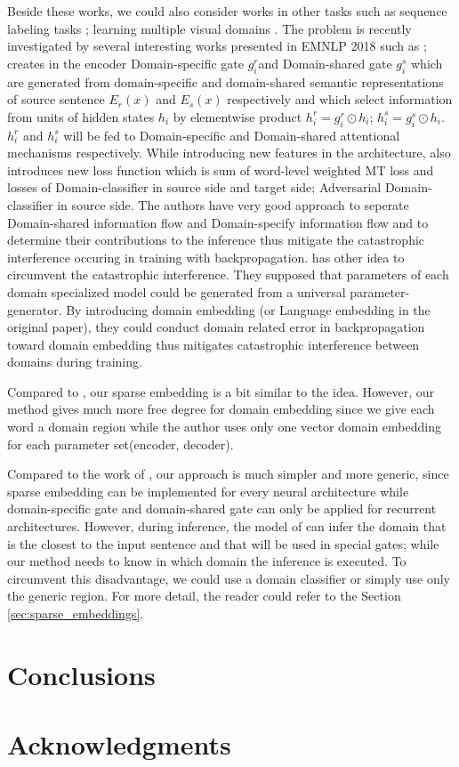 \documentclass[11pt,a4paper]{article}
\newcommand{\fyTodo}[1]{\Todo[FY:]{\textcolor{orange}{#1}}}
\begin{document}
Beside these works, we could also consider works in other tasks such as sequence labeling tasks \cite{Daume07frustratingly}; learning multiple visual domains \cite{Rebuffi2017Visual}. The problem is recently investigated by several interesting works presented in EMNLP 2018 such as \cite{Platanios18contextual}; \cite{Zeng18multidomain} creates in the encoder Domain-specific gate $g^r_i$and Domain-shared gate $g^s_i$ which are generated from domain-specific and domain-shared semantic representations of source sentence $E_r(x)$ and $E_s(x)$ respectively and which select information from units of hidden states $h_i$ by elementwise product $h^r_i = g^r_i \odot h_i$; $h^s_i = g^s_i \odot h_i$. $h^r_i$ and $h^s_i$ will be fed to Domain-specific and Domain-shared attentional mechanisms respectively. While introducing new features in the architecture, \cite{Zeng18multidomain} also introduces new loss function which is sum of word-level weighted MT loss and losses of Domain-classifier in source side and target side; Adversarial Domain-classifier in source side. The authors have very good approach to seperate Domain-shared information flow and Domain-specify information flow and to determine their contributions to the inference thus mitigate the catastrophic interference occuring in training with backpropagation. \cite{Platanios18contextual} has other idea to circumvent the catastrophic interference. They supposed that parameters of each domain specialized model could be generated from a universal parameter-generator. By introducing domain embedding (or Language embedding in the original paper), they could conduct domain related error in backpropagation toward domain embedding thus mitigates catastrophic interference between domains during training.

Compared to \cite{Platanios18contextual}, our sparse embedding is a bit similar to the idea. However, our method gives much more free degree for domain embedding since we give each word a domain region while the author uses only one vector domain embedding for each parameter set(encoder, decoder).

Compared to the work of \cite{Zeng18multidomain}, our approach is much simpler and
more generic, since sparse embedding can be implemented for every neural architecture while domain-specific gate and domain-shared gate can only be applied for recurrent architectures. However, during inference, the model of \cite{Zeng18multidomain} can infer the domain that is the closest to the input sentence and that will be used in special gates; while our method needs to know in which domain the inference is executed. To circumvent this disadvantage, we could use a domain classifier or simply use only the generic region. For more detail, the reader could refer to the Section \ref{sec:sparse_embeddings}.

\section{Conclusions}
\fyTodo{natural continuations: go beyond words; learn the projection matrix at the word level; other ?}

\section*{Acknowledgments}
\fyTodo{Homegenize refs - urls, addresses, etc}


\end{document}
